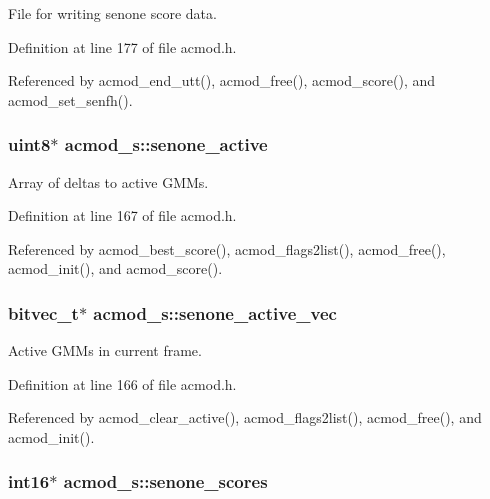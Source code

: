 File for writing senone score data. 



Definition at line 177 of file acmod.\-h.



Referenced by acmod\-\_\-end\-\_\-utt(), acmod\-\_\-free(), acmod\-\_\-score(), and acmod\-\_\-set\-\_\-senfh().

\subsubsection[{senone\-\_\-active}]{\setlength{\rightskip}{0pt plus 5cm}uint8$\ast$ acmod\-\_\-s\-::senone\-\_\-active}\label{structacmod__s_a5c98c727daf4e6bb23534e00b30cb5c2}


Array of deltas to active G\-M\-Ms. 



Definition at line 167 of file acmod.\-h.



Referenced by acmod\-\_\-best\-\_\-score(), acmod\-\_\-flags2list(), acmod\-\_\-free(), acmod\-\_\-init(), and acmod\-\_\-score().

\subsubsection[{senone\-\_\-active\-\_\-vec}]{\setlength{\rightskip}{0pt plus 5cm}bitvec\-\_\-t$\ast$ acmod\-\_\-s\-::senone\-\_\-active\-\_\-vec}\label{structacmod__s_a4a3ad3a3dc9a7b36c024c77729012e55}


Active G\-M\-Ms in current frame. 



Definition at line 166 of file acmod.\-h.



Referenced by acmod\-\_\-clear\-\_\-active(), acmod\-\_\-flags2list(), acmod\-\_\-free(), and acmod\-\_\-init().

\subsubsection[{senone\-\_\-scores}]{\setlength{\rightskip}{0pt plus 5cm}int16$\ast$ acmod\-\_\-s\-::senone\-\_\-scores}\label{structacmod__s_aa341539b98a5b13bef8589fc8d948da8}


